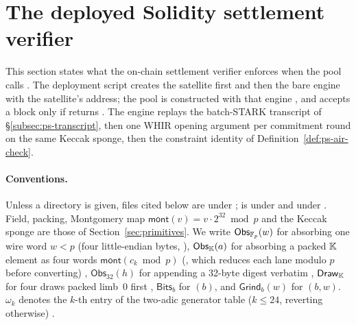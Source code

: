 \section{The deployed Solidity settlement verifier}
\label{sec:settlement-verifier}

This section states what the on-chain settlement verifier enforces when the pool
calls . The deployment script creates the
 satellite first and then the bare 
engine with the satellite's address; the pool is constructed with that engine
, and  accepts a block
only if  returns  .
The engine replays the batch-STARK transcript of \S\ref{subsec:ps-transcript},
then one WHIR opening argument per commitment round on the same Keccak sponge,
then the constraint identity of Definition~\ref{def:ps-air-check}.

\paragraph{Conventions.}
Unless a directory is given,  files cited below are under
;  is under
 and  under
. Field, packing, Montgomery map
$\mathsf{mont}(v) = v\cdot 2^{32} \bmod p$ and the Keccak sponge are those of
Section~\ref{sec:primitives}. We write $\mathsf{Obs}_{\mathbb{F}_p}(w)$ for absorbing one
wire word $w<p$ (four little-endian bytes, ),
$\mathsf{Obs}_{\mathbb{K}}(a)$ for absorbing a packed $\mathbb{K}$ element as four words
$\mathsf{mont}(c_k \bmod p)$ (, which reduces each lane modulo
$p$ before converting) ,
$\mathsf{Obs}_{32}(h)$ for appending a 32-byte digest verbatim
 ,
$\mathsf{Draw}_{\mathbb{K}}$ for four  draws packed limb~0 first
 ,
$\mathsf{Bits}_b$ for $(b)$, and $\mathsf{Grind}_b(w)$ for
$(b,w)$. $\omega_k$ denotes the $k$-th entry of the
two-adic generator table ($k \le 24$, reverting otherwise)
.

